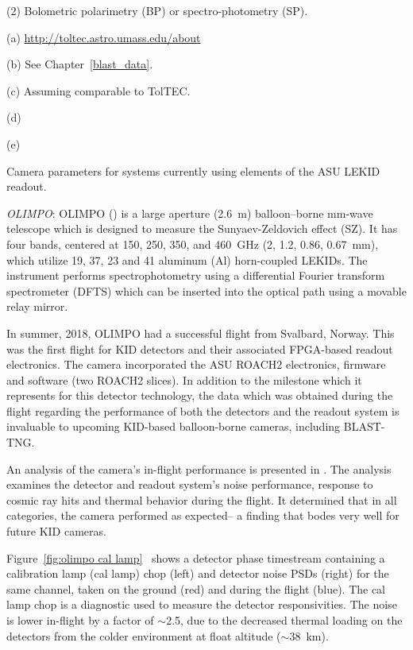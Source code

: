 \begin{table}
\begin{threeparttable}
\begin{tablenotes}
\item (2) Bolometric polarimetry (BP) or spectro-photometry (SP).
\item (a) \url{http://toltec.astro.umass.edu/about}
\item (b) See Chapter~\ref{blast_data}.
\item (c) Assuming comparable to TolTEC.
\item (d) \citet{paiella2019kinetic}
\item (e) \citet{mcgeehan2018low}
\end{tablenotes}
\caption{Camera parameters for systems currently using elements of the ASU LEKID readout.}
\label{tab:cameras}
\end{threeparttable}
\end{table}

\vspace{5mm}

\textit{OLIMPO}: OLIMPO (\citet{masi2008olimpo,paiella2019kinetic}) is a large aperture (2.6~m) balloon–borne mm-wave telescope which is designed to measure the Sunyaev-Zeldovich effect (SZ). It has four bands, centered at 150, 250, 350, and 460~GHz (2, 1.2, 0.86, 0.67~mm), which utilize 19, 37, 23 and 41 aluminum (Al) horn-coupled LEKIDs. The instrument performs spectrophotometry using a differential Fourier transform spectrometer (DFTS) which can be inserted into the optical path using a movable relay mirror.

In summer, 2018, OLIMPO had a successful flight from Svalbard, Norway. This was the first flight for KID detectors and their associated FPGA-based readout electronics. The camera incorporated the ASU ROACH2 electronics, firmware and software (two ROACH2 slices). In addition to the milestone which it represents for this detector technology, the data which was obtained during the flight regarding the performance of both the detectors and the readout system is invaluable to upcoming KID-based balloon-borne cameras, including BLAST-TNG.

An analysis of the camera's in-flight performance is presented in \citet{masi2019kinetic}. The analysis examines the detector and readout system's noise performance, response to cosmic ray hits and thermal behavior during the flight. It determined that in all categories, the camera performed as expected-- a finding that bodes very well for future KID cameras.

Figure~\ref{fig:olimpo cal lamp}~\citep{masi2019kinetic} shows a detector phase timestream containing a calibration lamp (cal lamp) chop (left) and detector noise PSDs (right) for the same channel, taken on the ground (red) and during the flight (blue). The cal lamp chop is a diagnostic used to measure the detector responsivities. The noise is lower in-flight by a factor of $\sim$2.5, due to the decreased thermal loading on the detectors from the colder environment at float altitude ($\sim$38~km).

